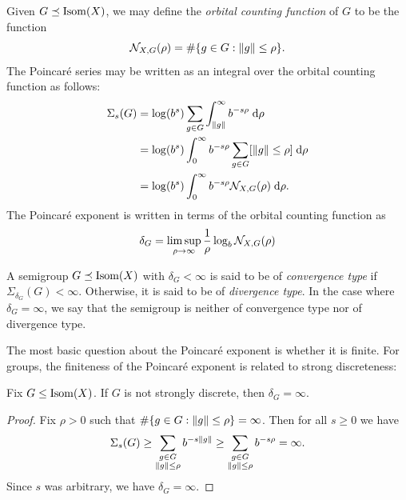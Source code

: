 \begin{remark}
\label{remarkorbitalcounting}
Given $G\preceq\operatorname{Isom}(X)$, we may define the \emph{orbital counting function} of $G$ to be the function
\[
\mathcal N_{X,G}(\rho) = \#\{g\in G : \|g\| \leq \rho\}.
\]
The Poincar\'e series may be written as an integral over the orbital counting function as follows:
\begin{equation}
\label{poincareseriesalternate}
\begin{split}
\Sigma_s(G) &= \log(b^s) \sum_{g\in G} \int_{\|g\|}^\infty b^{-s\rho} \;\mathrm{d} \rho\\
&= \log(b^s) \int_0^\infty b^{-s\rho} \sum_{g\in G}[\|g\|\leq \rho] \;\mathrm{d} \rho\\
&= \log(b^s) \int_0^\infty b^{-s\rho} \mathcal N_{X,G}(\rho) \;\mathrm{d} \rho.
\end{split}
\end{equation}
The Poincar\'e exponent is written in terms of the orbital counting function as
\begin{equation}
\label{poincarealternate}
\delta_G = \limsup_{\rho\to \infty} \frac1\rho\log_b \mathcal N_{X,G}(\rho)
\end{equation}
\end{remark}

\begin{definition}
\label{definitiondivergencetype}
A semigroup $G\preceq\operatorname{Isom}(X)$ with $\delta_G < \infty$ is said to be of \emph{convergence type} if $\Sigma_{\delta_G}(G) < \infty$. Otherwise, it is said to be of \emph{divergence type}. In the case where $\delta_G = \infty$, we say that the semigroup is neither of convergence type nor of divergence type.
\end{definition}

The most basic question about the Poincar\'e exponent is whether it is finite. For groups, the finiteness of the Poincar\'e exponent is related to strong discreteness:

\begin{observation}\label{observationnotstronglydiscrete}
Fix $G\leq\operatorname{Isom}(X)$. If $G$ is not strongly discrete, then $\delta_G = \infty$.
\end{observation}
\begin{proof}
Fix $\rho > 0$ such that $\#\{g\in G : \|g\| \leq \rho\} = \infty$. Then for all $s\geq 0$ we have
\[
\Sigma_s(G) \geq \sum_{\substack{g\in G\\ \|g\|\leq \rho}} b^{-s \|g\|} \geq \sum_{\substack{g\in G\\ \|g\|\leq \rho}} b^{-s\rho} = \infty .
\]
Since $s$ was arbitrary, we have $\delta_G = \infty$.
\end{proof}

